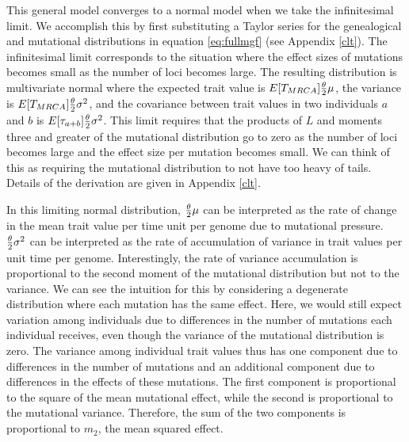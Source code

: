 This general model converges to a normal model when we take the infinitesimal
limit. We accomplish this by first substituting a Taylor series for the
genealogical and mutational distributions in equation \eqref{eq:fullmgf} (see
Appendix \ref{clt}). The infinitesimal limit corresponds to the situation where
the effect sizes of mutations becomes small as the number of loci becomes large.
The resulting distribution is multivariate normal where the expected trait value
is $E[T_{MRCA}] \frac{\theta}{2} \mu$, the variance is $E[T_{MRCA}] \frac{\theta}{2} \sigma^2$, and the
covariance between trait values in two individuals $a$ and $b$ is
$E[\tau_{a+b}] \frac{\theta}{2} \sigma^2$. This limit requires that the products of $L$ and
moments three and greater of the mutational distribution go to zero as the
number of loci becomes large and the effect size per mutation becomes small. We
can think of this as requiring the mutational distribution to not have too heavy
of tails. Details of the derivation are given in Appendix \ref{clt}.

In this limiting normal distribution, $\frac{\theta}{2} \mu$ can be interpreted as the rate of
change in the mean trait value per time unit per genome due to mutational
pressure. $\frac{\theta}{2} \sigma^2$ can be interpreted as the rate of accumulation of
variance in trait values per unit time per genome. Interestingly, the rate of
variance accumulation is proportional to the second moment of the mutational
distribution but not to the variance. We can see the intuition for this by
considering a degenerate distribution where each mutation has the same effect.
Here, we would still expect variation among individuals due to differences in
the number of mutations each individual receives, even though the variance of
the mutational distribution is zero. The variance among individual trait values
thus has one component due to differences in the number of mutations and an
additional component due to differences in the effects of these mutations. The
first component is proportional to the square of the mean mutational effect,
while the second is proportional to the mutational variance. Therefore, the sum
of the two components is proportional to $m_2$, the mean squared effect.

